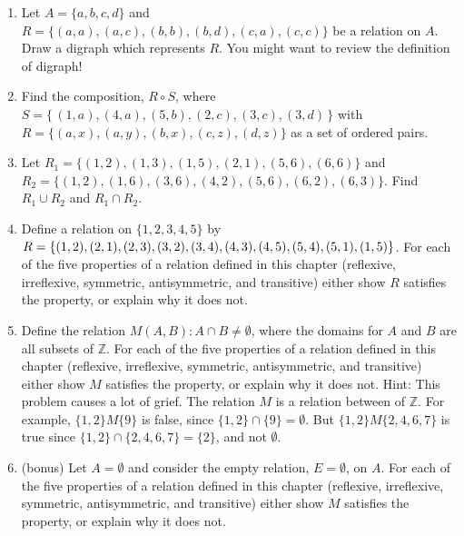 \documentclass[11pt]{amsart}
\begin{document}
\begin{enumerate}

\item  Let $A=\{a,b,c,d\}$ and $R=\{(a,a),(a,c), (b,b), (b,d),(c,a),(c,c)\}$ be a relation
on $A$. Draw a digraph which represents $R$. You might want to review the definition of digraph!\\[5pt]


\item Find the composition, $R\circ S$,  where $S = \{\,(1,a), (4,a),
(5,b), (2,c),  (3,c), (3,d)\,\}$ with $R  =\{(a,x),(a,y),(b,x),(c,z),(d,z)\}$ as a set of ordered pairs.\\[5pt]

\item Let $R_1=\{(1,2), (1,3), (1,5), (2,1), (5,6), (6,6)\}$ and\\
$R_2=\{(1,2),(1,6), (3,6), (4,2), (5,6), (6,2), (6,3)\}$. Find $R_1\cup R_2$ and $R_1\cap R_2$. \\[5pt]

\item Define a relation on $\{1,2,3,4,5\}$ by $R=\{(1,2),(2,1),(2,3),(3,2),(3,4),(4,3),\\
(4,5),(5,4),(5,1),(1,5)\}$. For each of the five properties of a relation defined in this chapter 
(reflexive, irreflexive, symmetric, antisymmetric, and transitive) 
either show $R$ satisfies the property, or explain why it does not.
\\[5pt]

\item Define the relation {\it $M(A,B) : A\cap B \not= \emptyset$}, where the
domains for $A$ and $B$ are all subsets of $\mathbb{Z}$. For each of the five properties of a 
relation defined in this chapter (reflexive, irreflexive, symmetric, antisymmetric, and transitive) 
either show $M$ satisfies the property, or explain why it does not.
\vskip 4pt
Hint: This problem causes a lot of grief. The relation $M$ is a relation between  
of $\mathbb{Z}$. For example, $\{1,2\} M \{ 9\}$ is false, since $\{1,2\}\cap \{9\} = \emptyset$. But 
$\{1,2\} M \{2,4,6,7\}$ is true since $\{1,2\} \cap \{2,4,6,7\} = \{2\}$, and not $\emptyset$.\\[5pt]

\item (bonus)  Let $A=\emptyset$ and consider the empty relation, $E=\emptyset$,  on $A$. 
For each of the five properties of a 
relation defined in this chapter (reflexive, irreflexive, symmetric, antisymmetric, and transitive) 
either show $M$ satisfies the property, or explain why it does not.


\end{enumerate}
\end{document}
